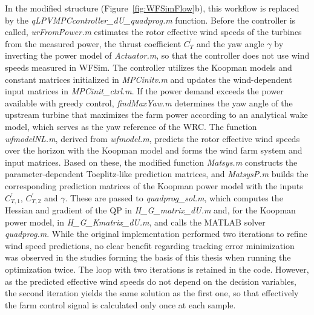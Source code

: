 In the modified structure (Figure~\ref{fig:WFSimFlow}b), this workflow is replaced by the \textit{qLPVMPCcontroller\_dU\_\allowbreak quadprog.m} function. Before the controller is called, \textit{urFromPower.m} estimates the rotor effective wind speeds of the turbines from the measured power, the thrust coefficient $C^{\prime}_T$ and the yaw angle $\gamma$ by inverting the power model of \textit{Actuator.m}, so that the controller does not use wind speeds measured in WFSim. The controller utilizes the Koopman models and constant matrices initialized in \textit{MPCinitv.m} and updates the wind-dependent input matrices in \textit{MPCinit\_ctrl.m}. If the power demand exceeds the power available with greedy control, \textit{findMaxYaw.m} determines the yaw angle of the upstream turbine that maximizes the farm power according to an analytical wake model, which serves as the yaw reference of the WRC. The function \textit{wfmodelNL.m}, derived from \textit{wfmodel.m}, predicts the rotor effective wind speeds over the horizon with the Koopman model and forms the wind farm system and input matrices. Based on these, the modified function \textit{Matsys.m} constructs the parameter-dependent Toeplitz-like prediction matrices, and \textit{MatsysP.m} builds the corresponding prediction matrices of the Koopman power model with the inputs $C^{\prime}_{T,1}$, $C^{\prime}_{T,2}$ and $\gamma$. These are passed to \textit{quadprog\_sol.m}, which computes the Hessian and gradient of the QP in \textit{H\_G\_matrix\_dU.m} and, for the Koopman power model, in \textit{H\_G\_Kmatrix\_dU.m}, and calls the MATLAB solver \textit{quadprog.m}. While the original implementation performed two iterations to refine wind speed predictions, no clear benefit regarding tracking error minimization was observed in the studies forming the basis of this thesis when running the optimization twice. The loop with two iterations is retained in the code. However, as the predicted effective wind speeds do not depend on the decision variables, the second iteration yields the same solution as the first one, so that effectively the farm control signal is calculated only once at each sample.
